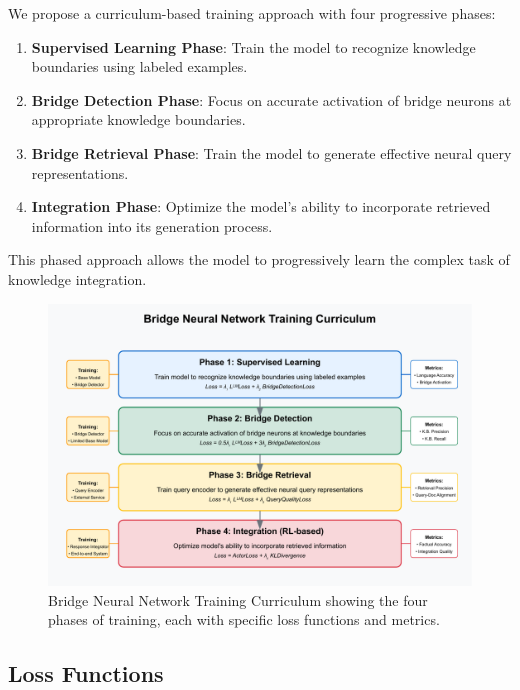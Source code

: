 \documentclass[9pt,a4paper,twocolumn,twoside]{tau-class/tau}
\begin{document}
    We propose a curriculum-based training approach with four progressive phases:

    \begin{enumerate}
        \item \textbf{Supervised Learning Phase}: Train the model to recognize knowledge boundaries using labeled examples.
        \item \textbf{Bridge Detection Phase}: Focus on accurate activation of bridge neurons at appropriate knowledge boundaries.
        \item \textbf{Bridge Retrieval Phase}: Train the model to generate effective neural query representations.
        \item \textbf{Integration Phase}: Optimize the model's ability to incorporate retrieved information into its generation process.
    \end{enumerate}

    This phased approach allows the model to progressively learn the complex task of knowledge integration.

    \begin{figure}[h]
        \centering
        \includegraphics[width=\columnwidth]{figures/figure5_training_curriculum.pdf}
        \caption{Bridge Neural Network Training Curriculum showing the four phases of training, each with specific loss functions and metrics.}
        \label{fig:training}
    \end{figure}

\subsection{Loss Functions}
\end{document}
